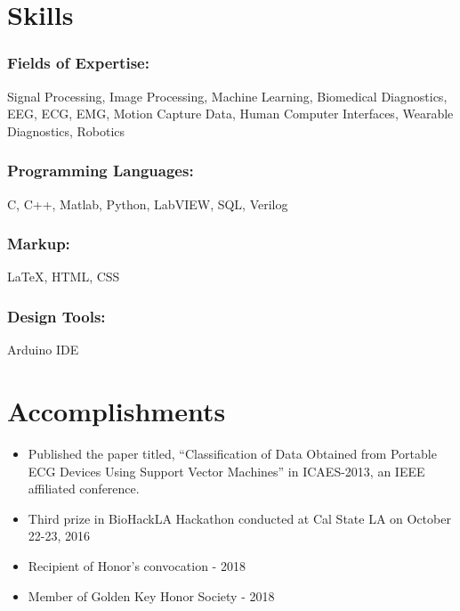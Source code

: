 \documentclass{article}
\begin{document}
\section{Skills}
\subsubsection{Fields of Expertise:} 
Signal Processing, Image Processing, Machine Learning, Biomedical Diagnostics, EEG, ECG, EMG, Motion Capture Data, Human Computer Interfaces, Wearable Diagnostics, Robotics
\subsubsection{Programming Languages:} 
C, C++, Matlab, Python, LabVIEW, SQL, Verilog
\subsubsection{Markup:} 
{\LaTeX}, HTML, CSS
\subsubsection{Design Tools:} 
Arduino IDE


\section{Accomplishments}
\begin{itemize}
    \item Published the paper titled, “Classification of Data Obtained from Portable ECG Devices Using Support Vector Machines” in ICAES-2013, an IEEE affiliated conference.
    \item Third prize in BioHackLA Hackathon conducted at Cal State LA on October 22-23, 2016
    \item Recipient of Honor's convocation - 2018
    \item Member of Golden Key Honor Society - 2018
\end{itemize}

\end{document}
